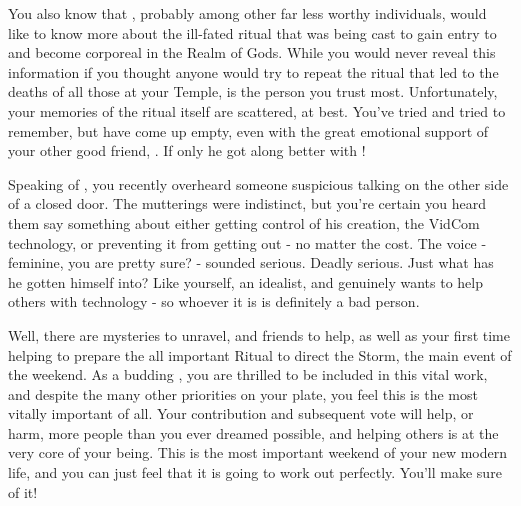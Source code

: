 \documentclass[char]{GL2020}
\begin{document}
You also know that \cWildCard{}, probably among other far less worthy individuals, would like to know more about the ill-fated ritual that was being cast to gain entry to and become corporeal in the Realm of Gods. While you would never reveal this information if you thought anyone would try to repeat the ritual that led to the deaths of all those at your Temple, \cWildCard{} is the person you trust most. Unfortunately, your memories of the ritual itself are scattered, at best. You’ve tried and tried to remember, but have come up empty, even with the great emotional support of your other good friend, \cTechStar{}. If only he got along better with \cWildCard{}!

Speaking of \cTechStar{}, you recently overheard someone suspicious talking on the other side of a closed door. The mutterings were indistinct, but you’re certain you heard them say something about either getting control of his creation, the VidCom technology, or preventing it from getting out - no matter the cost. The voice - feminine, you are pretty sure? - sounded serious. Deadly serious. Just what has he gotten himself into?  Like yourself, \cTechStar{\they} \cTechStar{\are} an idealist, and genuinely wants to help others with \cTechStar{\their} technology - so whoever it is is definitely a bad person.

Well, there are mysteries to unravel, and friends to help, as well as your first time helping to prepare the all important Ritual to direct the Storm, the main event of the weekend.  As a budding \cDisney{\cleric}, you are thrilled to be included in this vital work, and despite the many other priorities on your plate, you feel this is the most vitally important of all. Your contribution and subsequent vote will help, or harm, more people than you ever dreamed possible, and helping others is at the very core of your being. This is the most important weekend of your new modern life, and you can just feel that it is going to work out perfectly. You’ll make sure of it!





\end{document}
